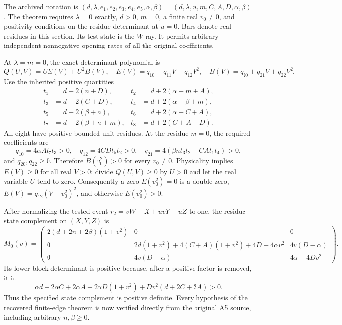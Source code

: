 The archived notation is
$(d,\lambda,e_1,e_2,e_3,e_4,e_5,\alpha,\beta)
=(d,\lambda,n,m,C,A,D,\alpha,\beta)$.
The theorem requires $\lambda=0$ exactly, $\bar d>0$, $\bar m=0$,
a finite real $v_0\ne0$, and positivity conditions on the residue
determinant at $u=0$. Bars denote real residues in this section.
Its test state is the $W$ ray. It permits arbitrary independent
nonnegative opening rates of all the original coefficients.

At $\lambda=m=0$, the exact determinant polynomial is
\[
 Q(U,V)=U E(V)+U^2 B(V),\quad
 E(V)=q_{10}+q_{11}V+q_{12}V^2,\quad
 B(V)=q_{20}+q_{21}V+q_{22}V^2.
\]
Use the inherited positive quantities
\begin{align*}
 t_1&=d+2(n+D),&t_2&=d+2(\alpha+m+A),\\
 t_3&=d+2(C+D),&t_4&=d+2(\alpha+\beta+m),\\
 t_5&=d+2(\beta+n),&t_6&=d+2(\alpha+C+A),\\
 t_7&=d+2(\beta+n+m),&t_8&=d+2(C+A+D).
\end{align*}
All eight have positive bounded-unit residues. At the residue $m=0$,
the required coefficients are
\[
 q_{10}=4\alpha A t_7t_3>0,\quad
 q_{12}=4CDt_5t_2>0,\quad
 q_{21}=4(\beta n t_3t_2+CA t_1t_4)>0,
\]
and $q_{20},q_{22}\geq0$. Therefore $B(v_0^2)>0$ for every
$v_0\ne0$. Physicality implies $E(V)\geq0$ for all real $V>0$:
divide $Q(U,V)\geq0$ by $U>0$ and let the real variable $U$ tend to
zero. Consequently a zero $E(v_0^2)=0$ is a double zero,
$E(V)=q_{12}(V-v_0^2)^2$, and otherwise $E(v_0^2)>0$.

After normalizing the tested event
$r_2=vW-X+uvY-uZ$ to one, the residue state complement on
$(X,Y,Z)$ is
\[
 M_0(v)=\begin{pmatrix}
 2(d+2n+2\beta)(1+v^2)&0&0\\
 0&2d(1+v^2)+4(C+A)(1+v^2)+4D+4\alpha v^2
                                      &4v(D-\alpha)\\
 0&4v(D-\alpha)&4\alpha+4Dv^2
 \end{pmatrix}.
\]
Its lower-block determinant is positive because, after a positive factor
is removed, it is
\[
 \alpha d+2\alpha C+2\alpha A+2\alpha D(1+v^2)
                      +Dv^2(d+2C+2A)>0.
\]
Thus the specified state complement is positive definite. Every
hypothesis of the recovered finite-edge theorem is now verified
directly from the original A5 source, including arbitrary $n,\beta\geq0$.


